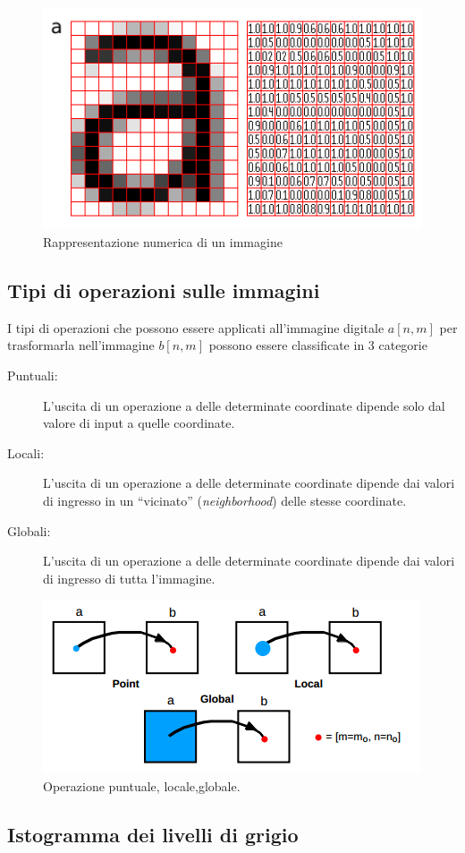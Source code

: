 \begin{figure}
\centering
\includegraphics[width=.5\textwidth]{img/image-grid.png}
\caption{Rappresentazione numerica di un immagine}\label{fig:image-grid}
\end{figure}

\subsection{Tipi di operazioni sulle immagini}
I tipi di operazioni che possono essere applicati all'immagine digitale $a[n,m]$
per trasformarla nell'immagine $b[n,m]$ possono essere classificate in 3 categorie \cite{Parker:2010:AIP:1965423}

\begin{description}
\item[Puntuali:] 	L'uscita di un operazione a delle determinate coordinate dipende solo dal valore di input a quelle coordinate.
\item[Locali: ] L'uscita di un operazione a delle determinate coordinate dipende dai valori di ingresso in un ``vicinato'' (\emph{neighborhood}) delle stesse coordinate.
\item[Globali: ] L'uscita di un operazione a delle determinate coordinate dipende dai valori di ingresso di tutta l'immagine.
\end{description}


\begin{figure}
\centering
\includegraphics[width=.5\textwidth]{img/puntuale-locale-globale.png}
\caption{Operazione puntuale, locale,globale.}\label{fig:puntuale-locale-globale}
\end{figure}

\subsection{Istogramma dei livelli di grigio}

